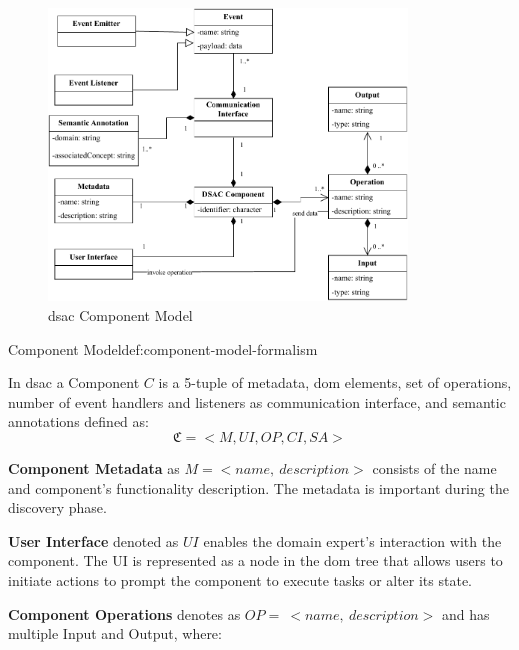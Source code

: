 \begin{figure}[hbt]
\hypertarget{fig:component-model}{%
\centering
\includegraphics[width=0.85\textwidth]{../figures/MyFigures/ComponentModel.drawio.pdf}
\captionsetup{justification=centering}
\caption{\gls{dsac} Component Model}\label{fig:component-model}
}
\end{figure}

\begin{thesisdefinition}{Component Model}{def:component-model-formalism}

In \gls{dsac} a Component \(C\) is a 5-tuple of metadata, \gls{dom} elements, set of operations, number of event handlers and listeners as communication interface, and semantic annotations defined as:
\begin{equation}\mathfrak{C} = <M,UI,OP,CI,SA>\label{eq:component-tuple}\end{equation}
\end{thesisdefinition}

\vspace{-5pt}
\textbf{Component Metadata} as 	\(M = < name,\ description >\) consists of the name and component's functionality description. The metadata is important during the discovery phase.

\textbf{User Interface} denoted as \(UI\) enables the domain expert's interaction with the component. The UI is represented as a node in the \gls{dom} tree that allows users to initiate actions to prompt the component to execute tasks or alter its state.

\textbf{Component Operations} denotes as
\(OP = \  < name,\ description >\) and has multiple Input and Output, where:

